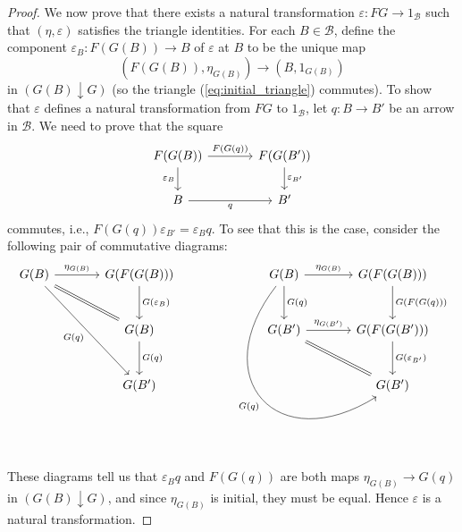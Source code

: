 \documentclass[10pt,oneside]{book}
\def\~#1{\mathscr{#1}}
\newcommand{\ve}{\varepsilon}
\theoremstyle{plain}
\theoremstyle{definition}
\theoremstyle{remark}
\numberwithin{equation}{section}
\numberwithin{figure}{section}
\begin{document}
\begin{proof}
    We now prove that there exists a natural transformation $\ve: FG \to 1_{\~B}$ such that $(\eta, \ve)$ satisfies the triangle identities. For each $B \in \~B$, define the component $\ve_B: F(G(B)) \to B$ of $\ve$ at $B$ to be the unique map
    \[\left(F(G(B)), \eta_{G(B)}\right) \to \left(B, 1_{G(B)}\right)\]
    in $(G(B) \downarrow G)$ (so the triangle (\ref{eq:initial_triangle}) commutes). To show that $\ve$ defines a natural transformation from $FG$ to $1_{\~B}$, let $q: B \to B'$ be an arrow in $\~B$. We need to prove that the square
    \[\begin{tikzcd}[column sep = large]
    {F(G(B))} & {F(G(B'))} \\
    B & {B'}
    \arrow["{F(G(q))}", from=1-1, to=1-2]
    \arrow["{\ve_B}"', from=1-1, to=2-1]
    \arrow["{\ve_{B'}}", from=1-2, to=2-2]
    \arrow["q"', from=2-1, to=2-2]
    \end{tikzcd}\]
    commutes, i.e., $F(G(q))\ve_{B'} = \ve_{B} q$. To see that this is the case, consider the following pair of commutative diagrams:
    \[\begin{tikzcd}[column sep = large, row sep = large]
    {G(B)} & {G(F(G(B)))} \\
    & {G(B)} \\
    & {G(B')}
    \arrow["{\eta_{G(B)}}", from=1-1, to=1-2]
    \arrow[Rightarrow, no head, from=1-1, to=2-2]
    \arrow["{G(q)}"', from=1-1, to=3-2]
    \arrow["{G(\ve_B)}", from=1-2, to=2-2]
    \arrow["{G(q)}", from=2-2, to=3-2]
\end{tikzcd} \qquad \begin{tikzcd}[row sep = large, column sep = scriptsize]
    {G(B)} && {G(F(G(B)))} \\
    {G(B')} && {G(F(G(B')))} \\
    && {G(B')}
    \arrow["{\eta_{G(B)}}", from=1-1, to=1-3]
    \arrow["{G(q)}", from=1-1, to=2-1]
    \arrow["{G(q)}"', bend right = 80, looseness = 2, from=1-1, to=3-3]
    \arrow["{G(F(G(q)))}", from=1-3, to=2-3]
    \arrow["{\eta_{G(B')}}", from=2-1, to=2-3]
    \arrow[Rightarrow, no head, from=2-1, to=3-3]
    \arrow["{G(\ve_{B'})}", from=2-3, to=3-3]
\end{tikzcd}\]
These diagrams tell us that $\ve_B q$ and $F(G(q))$ are both maps $\eta_{G(B)} \to G(q)$ in $(G(B) \downarrow G)$, and since $\eta_{G(B)}$ is initial, they must be equal. Hence $\ve$ is a natural transformation. 


\end{proof}
\end{document}
